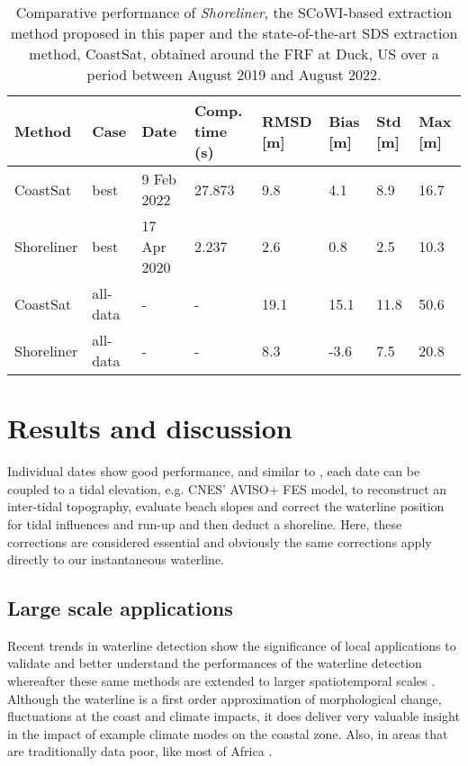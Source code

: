 \documentclass[remotesensing,technicalnote,submit,pdftex,moreauthors]{Definitions/mdpi}
\begin{document}
\begin{table}[H] 
\caption{Comparative performance of \textit{Shoreliner}, the SCoWI-based extraction method proposed in this paper and the state-of-the-art SDS extraction method, CoastSat, obtained around the FRF at Duck, US over a period between August 2019 and August 2022.\label{tab1}}
\begin{tabularx}{\textwidth}{CCCCCCCC}
\toprule
\textbf{Method}	& \textbf{Case} & Date & \textbf{Comp. time (s)} & \textbf{RMSD [m]} & \textbf{Bias [m]}  & \textbf{Std [m]} & \textbf{Max [m]}\\
\midrule
CoastSat            & best & 9 Feb 2022 & 27.873  & 9.8 & 4.1 &  8.9 & 16.7 \\
Shoreliner  & best & 17 Apr 2020 & 2.237	   & 2.6  &  0.8 &  2.5 & 10.3\\
CoastSat            & all-data & -& -         & 19.1 & 15.1 & 11.8 & 50.6 \\
Shoreliner  & all-data & - & -         & 8.3  & -3.6 &  7.5 & 20.8 \\
\bottomrule
\end{tabularx}
\end{table}

\section{Results and discussion}
Individual dates show good performance, and similar to \citet{VOS2019_google}, each date can be coupled to a tidal elevation, e.g. CNES' AVISO+ FES model, to reconstruct an inter-tidal topography, evaluate beach slopes and correct the waterline position for tidal influences and run-up and then deduct a shoreline. Here, these corrections are considered essential and obviously the same corrections apply directly to our instantaneous waterline. 

\subsection{Large scale applications}
Recent trends in waterline detection show the significance of local applications to validate and better understand the performances of the waterline detection whereafter these same methods are extended to larger spatiotemporal scales \citep{VOS2019_sub, almar2023influence, Vos2023}. Although the waterline is a first order approximation of morphological change, fluctuations at the coast and climate impacts, it does deliver very valuable insight in the impact of example climate modes on the coastal zone. Also, in areas that are traditionally data poor, like most of Africa \citep{almar2022coastal}.  
\end{document}

